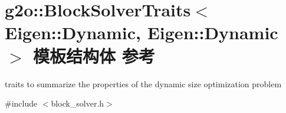 \hypertarget{structg2o_1_1BlockSolverTraits_3_01Eigen_1_1Dynamic_00_01Eigen_1_1Dynamic_01_4}{\section{g2o\-:\-:Block\-Solver\-Traits$<$ Eigen\-:\-:Dynamic, Eigen\-:\-:Dynamic $>$ 模板结构体 参考}
\label{structg2o_1_1BlockSolverTraits_3_01Eigen_1_1Dynamic_00_01Eigen_1_1Dynamic_01_4}
}


traits to summarize the properties of the dynamic size optimization problem  




{\ttfamily \#include $<$block\-\_\-solver.\-h$>$}

